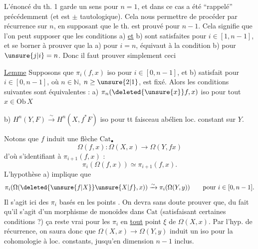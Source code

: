 L'énoncé du th. 1 garde un sens pour $n=1$, et dans ce cas a été ``rappelé'' précédemment (et est $\pm$ tautologique).
Cela\unsure{$=$}  nous permettre de procéder par récurrence sur $n$, en supposant que le th. est prouvé pour $n-1$. Cela signifie que l'on peut supposer que les conditions a) \uline{et} b) sont satisfaites  pour $i\in[1,n-1]$, et se borner à prouver que   la  a) pour $i=n$, équivaut à la condition b) pour $\unsure{j|i}=n$.
Donc il faut prouver simplement ceci

\uline{Lemme} Supposons que $\pi_i(f,x)$ iso pour $i\in[0,n-1]$, et b) satisfait pour $i\in[0,n-1]$, où $n\in\mathbb N$, $n\geq\unsure{2|1}$, est fixé. Alors les conditions suivantes sont équivalentes :
a) $\pi_n(\deleted{\unsure{x}}f,x)$  iso pour tout $x\in\mathrm{Ob}\,X$

b) $H^n(Y,F)\xrightarrow{\sim}H^n(X,f^*F)$ iso pour tt faisceau abélien loc. constant sur $Y$.

Notons que  $f$ induit une flèche  $\mathrm{Cat}_{\bullet}$
\[
\Omega(f,x):\Omega(X,x)\longrightarrow\Omega(Y,fx)
\]
d'où
s'identifiant à $\pi_{i+1}(f,x)$ :
\[
\pi_i(\Omega(f,x))\simeq\pi_{i+1}(f,x).
\]
L'hypothèse  a)  implique que
\[
\pi_i(\Omega(\deleted{\unsure{f|X}}\unsure{X|f},x))\xrightarrow{\sim}\pi_i(\Omega(Y,y))\qquad\text{pour }i\in[0,n-1].
\]
Il s'agit ici des $\pi_i$ basés en les points . On devra sans doute prouver que, du fait qu'il s'agit d'un morphisme de monoïdes dans $\mathrm{Cat}$ (satisfaisant certaines conditions ?) ça reste vrai pour les $\pi_i$ en \uline{tout} point $\xi$ de $\Omega(X,x)$. Par l'hyp. de récurrence, on saura donc que $\Omega(X,x)\to\Omega(Y,y)$
induit un iso pour la cohomologie à  loc. constants, jusqu'en dimension $n-1$ inclus.

